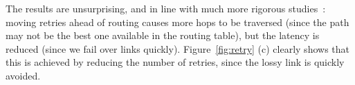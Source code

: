 The results are unsurprising, and in line with much more rigorous
studies~\cite{rhea_usenix_2004,dabek_nsdi04}: moving retries ahead of
routing causes more hops to be traversed (since the path may not be
the best one available in the routing table), but the latency is
reduced (since we fail over links quickly).  Figure~\ref{fig:retry}
(c) clearly shows that this is achieved by reducing the number of
retries, since the lossy link is quickly avoided. 




